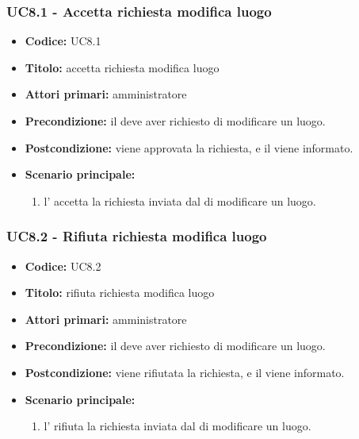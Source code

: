 \documentclass[casi-duso]{subfiles}
\begin{document}
\subsubsection{UC8.1 - Accetta richiesta modifica luogo}
\label{subsub:UC8.1}
\begin{itemize}
  \item \textbf{Codice:} UC8.1
  \item \textbf{Titolo:} accetta richiesta modifica luogo
  \item \textbf{Attori primari:} amministratore
  \item \textbf{Precondizione:} il  deve aver richiesto di modificare un luogo.
  \item \textbf{Postcondizione:} viene approvata la richiesta, e il  viene informato.
  \item \textbf{Scenario principale:} 
  \begin{enumerate}
    \item  l' accetta la richiesta inviata dal  di modificare un luogo.
  \end{enumerate}
\end{itemize}

\subsubsection{UC8.2 - Rifiuta richiesta modifica luogo}
\label{subsub:UC8.2}
\begin{itemize}
  \item \textbf{Codice:} UC8.2
  \item \textbf{Titolo:} rifiuta richiesta modifica luogo
  \item \textbf{Attori primari:} amministratore
  \item \textbf{Precondizione:} il  deve aver richiesto di modificare un luogo.
  \item \textbf{Postcondizione:} viene rifiutata la richiesta, e il  viene informato.
  \item \textbf{Scenario principale:}
  \begin{enumerate}
    \item l' rifiuta la richiesta inviata dal  di modificare un luogo.
  \end{enumerate}  
\end{itemize}
\end{document}
